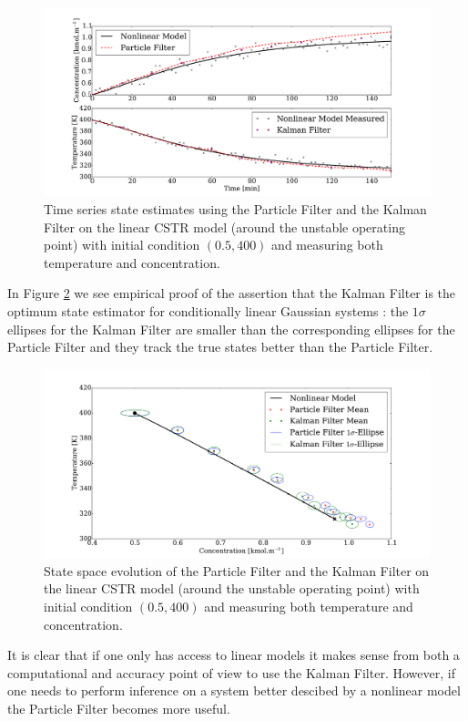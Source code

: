 \documentclass[../masters.tex]{subfiles}
\begin{document}
\begin{figure}[H] 
\centering
\includegraphics[scale=0.30]{pf_kf_time.pdf}
\caption{Time series state estimates using the Particle Filter and the Kalman Filter on the linear CSTR model (around the unstable operating point) with initial condition $(0.5, 400)$ and measuring both temperature and concentration.}
\label{fig_pf_kf_time}
\end{figure}
In Figure \ref{fig_pf_kf_phase} we see empirical proof of the assertion that the Kalman Filter is the optimum state estimator for conditionally linear Gaussian systems \cite{shalom}: the $1\sigma$ ellipses for the Kalman Filter are smaller than the corresponding ellipses for the Particle Filter and they track the true states better than the Particle Filter. 
\begin{figure}[H] 
\centering
\includegraphics[scale=0.30]{pf_kf_phase.pdf}
\caption{State space evolution of the Particle Filter and the Kalman Filter on the linear CSTR model (around the unstable operating point) with initial condition $(0.5, 400)$ and measuring both temperature and concentration.}
\label{fig_pf_kf_phase}
\end{figure}
It is clear that if one only has access to linear models it makes sense from both a computational and accuracy point of view to use the Kalman Filter. However, if one needs to perform inference on a system better descibed by a nonlinear model the Particle Filter becomes more useful.




\end{document}

